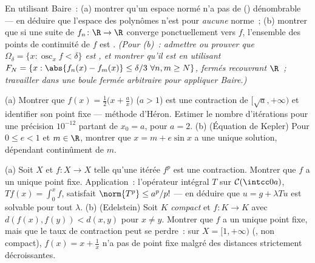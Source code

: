 \begin{exercise}[$\star$]\label{exo:b3:complete:2}
En utilisant Baire~: (a) montrer qu'un espace normé  n'a
pas de  () dénombrable --- en déduire que
l'espace des polynômes n'est  pour \emph{aucune}
norme~; (b) montrer que si une suite de $f_n \colon \R \to \R$
 converge ponctuellement vers $f$, l'ensemble des
points de continuité de $f$ est .
\emph{(Pour (b)~: admettre ou prouver que $\Omega_\delta =
\{x : \operatorname{osc}_x f < \delta\}$ est , et
montrer qu'il est  en utilisant $F_{N} = \{x:
\abs{f_n(x) - f_m(x)} \leq \delta/3\ \forall n,m \geq N\}$,
fermés recouvrant $\R$~; travailler dans une boule fermée
arbitraire pour appliquer Baire.)}
\end{exercise}

\begin{exercise}[$\star\star$]\label{exo:b3:complete:3}
(a) Montrer que $f(x) = \frac12\bigl(x + \frac ax\bigr)$ ($a >
1$) est une contraction de $[\sqrt a, +\infty)$ et identifier
son point fixe --- méthode d'Héron. Estimer le nombre
d'itérations pour une précision $10^{-12}$ partant de $x_0 =
a$, pour $a = 2$.
(b) (Équation de Kepler) Pour $0 \leq e < 1$ et $m \in \R$,
montrer que $x = m + e\sin x$ a une unique solution, dépendant
continûment de $m$.
\end{exercise}

\begin{exercise}[$\star\star$]\label{exo:b3:complete:4}
(a) Soit $X$  et $f \colon X \to X$ telle qu'une
itérée $f^p$ est une contraction. Montrer que $f$ a un unique
point fixe. Application~: l'opérateur intégral $T$ sur
$\mathcal C(\intcc0a)$, $Tf(x) = \int_0^x f$, satisfait
$\norm{T^p} \leq a^p/p!$ --- en déduire que $u = g + \lambda
Tu$ est solvable pour tout $\lambda$.
(b) (Edelstein) Soit $K$ \emph{compact} et $f\colon K \to K$
avec $d(f(x), f(y)) < d(x, y)$ pour $x \neq y$. Montrer que
$f$ a un unique point fixe, mais que le taux de contraction
peut se perdre~: sur $X = [1, +\infty)$ (, non
compact), $f(x) = x + \frac1x$ n'a pas de point fixe malgré
des distances strictement décroissantes.
\end{exercise}

